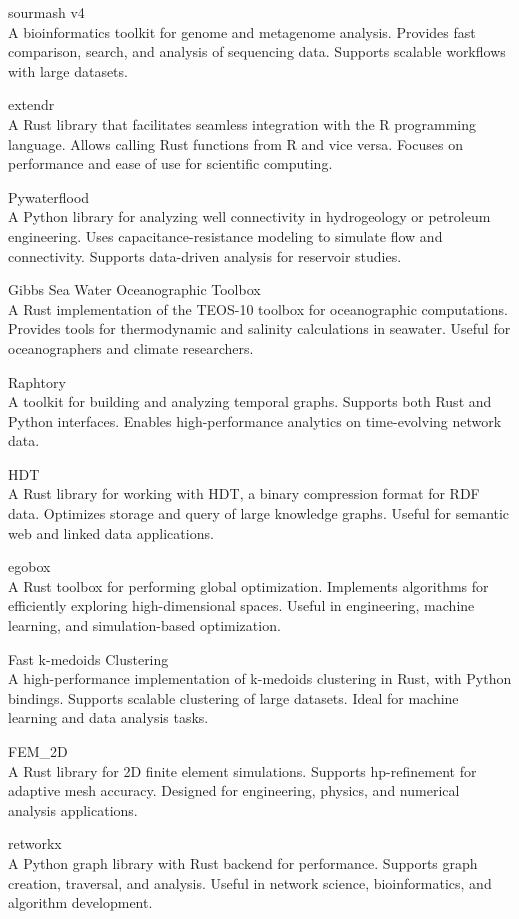 \documentclass{article}
\begin{document}
sourmash v4\\
A bioinformatics toolkit for genome and metagenome analysis. Provides fast
comparison, search, and analysis of sequencing data. Supports scalable workflows with large
datasets.

extendr\\
A Rust library that facilitates seamless integration with the R programming language.
Allows calling Rust functions from R and vice versa. Focuses on performance and ease of use for
scientific computing.

Pywaterflood\\
A Python library for analyzing well connectivity in hydrogeology or petroleum
engineering. Uses capacitance-resistance modeling to simulate flow and connectivity. Supports
data-driven analysis for reservoir studies.

Gibbs Sea Water Oceanographic Toolbox\\
A Rust implementation of the TEOS-10 toolbox for
oceanographic computations. Provides tools for thermodynamic and salinity calculations in seawater.
Useful for oceanographers and climate researchers.

Raphtory\\
A toolkit for building and analyzing temporal graphs. Supports both Rust and Python
interfaces. Enables high-performance analytics on time-evolving network data.

HDT\\
A Rust library for working with HDT, a binary compression format for RDF data. Optimizes
storage and query of large knowledge graphs. Useful for semantic web and linked data applications.

egobox\\
A Rust toolbox for performing global optimization. Implements algorithms for efficiently
exploring high-dimensional spaces. Useful in engineering, machine learning, and simulation-based
optimization.

Fast k-medoids Clustering\\
A high-performance implementation of k-medoids clustering in Rust, with
Python bindings. Supports scalable clustering of large datasets. Ideal for machine learning and
data analysis tasks.

FEM\_2D\\
A Rust library for 2D finite element simulations. Supports hp-refinement for adaptive
mesh accuracy. Designed for engineering, physics, and numerical analysis applications.

retworkx\\
A Python graph library with Rust backend for performance. Supports graph creation,
traversal, and analysis. Useful in network science, bioinformatics, and algorithm development.
\end{document}
